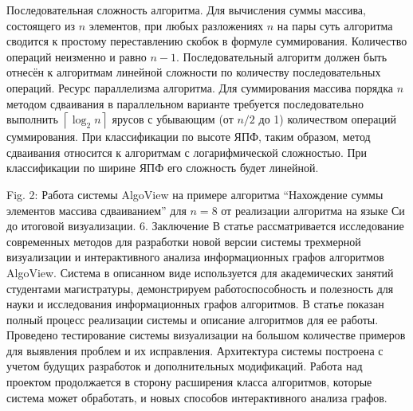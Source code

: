 Последовательная сложность алгоритма. Для вычисления суммы массива, состоящего из $n$ элементов, при любых разложениях $n$ на пары суть алгоритма сводится к простому переставлению скобок в формуле суммирования. Количество операций неизменно и равно $n-1$. Последовательный алгоритм должен быть отнесён к алгоритмам линейной сложности по количеству последовательных операций.
Ресурс параллелизма алгоритма. Для суммирования массива порядка $n$ методом сдваивания в параллельном варианте требуется последовательно выполнить $\left\lceil{\log_2n}\right\rceil$ ярусов с убывающим (от $n/2$ до 1) количеством операций суммирования. При классификации по высоте ЯПФ, таким образом, метод сдваивания относится к алгоритмам с логарифмической сложностью. При классификации по ширине ЯПФ его сложность будет линейной.

Fig. 2: Работа системы AlgoView на примере алгоритма “Нахождение суммы элементов массива сдваиванием” для $n = 8$ от реализации алгоритма на языке Си до итоговой визуализации.
6. Заключение
В статье рассматривается исследование современных методов для разработки новой версии системы трехмерной визуализации и интерактивного анализа информационных графов алгоритмов AlgoView. Система в описанном виде используется для академических занятий студентами магистратуры, демонстрируем работоспособность и полезность для науки и исследования информационных графов алгоритмов. В статье показан полный процесс реализации системы и описание алгоритмов для ее работы. Проведено тестирование системы визуализации на большом количестве примеров для выявления проблем и их исправления. Архитектура системы построена с учетом будущих разработок и дополнительных модификаций. Работа над проектом продолжается в сторону расширения класса алгоритмов, которые система может обработать, и новых способов интерактивного анализа графов.


